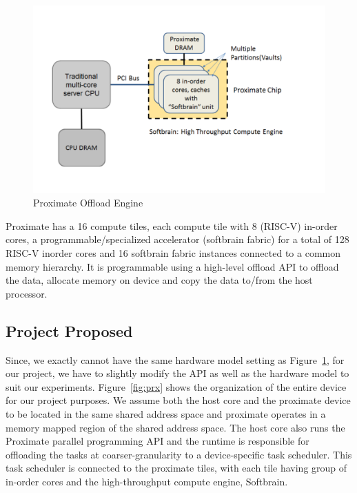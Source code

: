 \begin{figure}
  \begin{center}
    \includegraphics[width=\linewidth]{cs758-figs/prx-orig.png}
  \end{center}
\vspace{-0.9in}
  \caption{Proximate Offload Engine}
  \label{fig:prx-orig}
\vspace{-0.05in}
\end{figure}

Proximate has a 16 compute tiles, 
each compute tile with 8 (RISC-V) in-order cores, 
a programmable/specialized accelerator (softbrain
fabric) for a total of 128 RISC-V inorder cores and 
16 softbrain fabric instances connected to a common 
memory hierarchy. It is programmable using a high-level 
offload API to offload the data, allocate memory on device and 
copy the data to/from the host processor. 


\subsection{Project Proposed}
Since, we exactly cannot have the same hardware model setting as Figure~\ref{fig:prx-orig},
for our project, we have to slightly modify the API as well as the hardware model to suit our experiments.
Figure~\ref{fig:prx} shows the organization of the entire device for our
project purposes. We assume both the host core and the proximate device
to be located in the same shared address space and proximate operates
in a memory mapped region of the shared address space. 
The host core also runs the Proximate parallel programming API and the runtime
is responsible for offloading the tasks at coarser-granularity to a device-specific
task scheduler. This task scheduler is connected to the proximate tiles, with each tile
having group of in-order cores and the high-throughput compute engine, Softbrain. 


